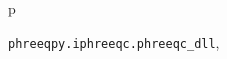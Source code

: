 \documentclass[letterpaper,10pt,english]{sphinxmanual}
\begin{document}
\renewcommand{\indexname}{Python Module Index}
\begin{theindex}
\def\bigletter#1{{\Large\sffamily#1}\nopagebreak\vspace{1mm}}
\bigletter{p}
\item {\texttt{phreeqpy.iphreeqc.phreeqc\_dll}}, \pageref{iphreeqc:module-phreeqpy.iphreeqc.phreeqc_dll}
\end{theindex}

\renewcommand{\indexname}{Index}
\printindex
\end{document}
